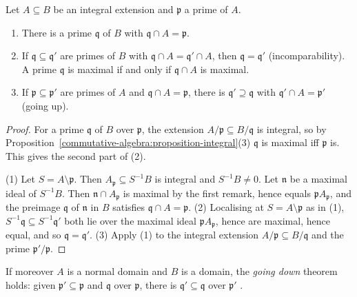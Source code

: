 \begin{theorem}\label{commutative-algebra:theorem-going-up}
Let $A \subseteq B$ be an integral extension and $\mathfrak{p}$ a prime of $A$.
\begin{enumerate}
\item There is a prime $\mathfrak{q}$ of $B$ with $\mathfrak{q} \cap A = \mathfrak{p}$.
\item If $\mathfrak{q} \subseteq \mathfrak{q}'$ are primes of $B$ with $\mathfrak{q} \cap A = \mathfrak{q}' \cap A$, then $\mathfrak{q} = \mathfrak{q}'$
(incomparability). A prime $\mathfrak{q}$ is maximal if and only if $\mathfrak{q} \cap A$ is maximal.
\item If $\mathfrak{p} \subseteq \mathfrak{p}'$ are primes of $A$ and $\mathfrak{q} \cap A = \mathfrak{p}$, there is $\mathfrak{q}' \supseteq \mathfrak{q}$ with
$\mathfrak{q}' \cap A = \mathfrak{p}'$ (going up).
\end{enumerate}
\end{theorem}

\begin{proof}
For a prime $\mathfrak{q}$ of $B$ over $\mathfrak{p}$, the extension $A/\mathfrak{p} \subseteq B/\mathfrak{q}$ is integral, so by
Proposition~\ref{commutative-algebra:proposition-integral}(3) $\mathfrak{q}$ is maximal iff $\mathfrak{p}$ is. This gives the second
part of (2).

(1) Let $S = A \setminus \mathfrak{p}$. Then $A_\mathfrak{p} \subseteq S^{-1}B$ is integral and $S^{-1}B \neq 0$. Let $\mathfrak{n}$ be a maximal
ideal of $S^{-1}B$. Then $\mathfrak{n} \cap A_\mathfrak{p}$ is maximal by the first remark, hence equals $\mathfrak{p}A_\mathfrak{p}$, and the
preimage $\mathfrak{q}$ of $\mathfrak{n}$ in $B$ satisfies $\mathfrak{q} \cap A = \mathfrak{p}$.
(2) Localising at $S = A \setminus \mathfrak{p}$ as in (1), $S^{-1}\mathfrak{q} \subseteq S^{-1}\mathfrak{q}'$ both lie over the maximal ideal
$\mathfrak{p}A_\mathfrak{p}$, hence are maximal, hence equal, and so $\mathfrak{q} = \mathfrak{q}'$.
(3) Apply (1) to the integral extension $A/\mathfrak{p} \subseteq B/\mathfrak{q}$ and the prime $\mathfrak{p}'/\mathfrak{p}$.
\end{proof}

\begin{remark}\label{commutative-algebra:remark-going-down}
If moreover $A$ is a normal domain and $B$ is a domain, the \emph{going down} theorem holds: given $\mathfrak{p}' \subseteq \mathfrak{p}$ and
$\mathfrak{q}$ over $\mathfrak{p}$, there is $\mathfrak{q}' \subseteq \mathfrak{q}$ over $\mathfrak{p}'$ \cite[Theorem 5.16]{atiyah-macdonald}.
\end{remark}

